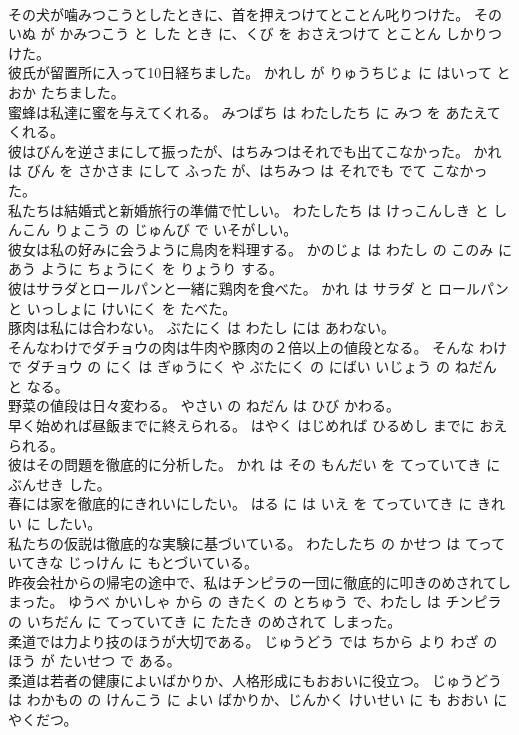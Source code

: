 \documentclass[8pt]{extreport}
\begin{document}
\begin{CJK}{UTF8}{min}
\\	その犬が噛みつこうとしたときに、首を押えつけてとことん叱りつけた。	その いぬ が かみつこう と した とき に、くび を おさえつけて とことん しかりつけた。	
\\	彼氏が留置所に入って10日経ちました。	かれし が りゅうちじょ に はいって とおか たちました。	
\\	蜜蜂は私達に蜜を与えてくれる。	みつばち は わたしたち に みつ を あたえて くれる。	
\\	彼はびんを逆さまにして振ったが、はちみつはそれでも出てこなかった。	かれ は びん を さかさま にして ふった が、はちみつ は それでも でて こなかった。	
\\	私たちは結婚式と新婚旅行の準備で忙しい。	わたしたち は けっこんしき と しんこん りょこう の じゅんび で いそがしい。	
\\	彼女は私の好みに会うように鳥肉を料理する。	かのじょ は わたし の このみ にあう ように ちょうにく を りょうり する。	
\\	彼はサラダとロールパンと一緒に鶏肉を食べた。	かれ は サラダ と ロールパン と いっしょに けいにく を たべた。	
\\	豚肉は私には合わない。	ぶたにく は わたし には あわない。	
\\	そんなわけでダチョウの肉は牛肉や豚肉の２倍以上の値段となる。	そんな わけ で ダチョウ の にく は ぎゅうにく や ぶたにく の にばい いじょう の ねだん と なる。	
\\	野菜の値段は日々変わる。	やさい の ねだん は ひび かわる。	
\\	早く始めれば昼飯までに終えられる。	はやく はじめれば ひるめし までに おえられる。	
\\	彼はその問題を徹底的に分析した。	かれ は その もんだい を てっていてき に ぶんせき した。	
\\	春には家を徹底的にきれいにしたい。	はる に は いえ を てっていてき に きれい に したい。	
\\	私たちの仮説は徹底的な実験に基づいている。	わたしたち の かせつ は てっていてきな じっけん に もとづいている。	
\\	昨夜会社からの帰宅の途中で、私はチンピラの一団に徹底的に叩きのめされてしまった。	ゆうべ かいしゃ から の きたく の とちゅう で、わたし は チンピラ の いちだん に てっていてき に たたき のめされて しまった。	
\\	柔道では力より技のほうが大切である。	じゅうどう では ちから より わざ の ほう が たいせつ で ある。	
\\	柔道は若者の健康によいばかりか、人格形成にもおおいに役立つ。	じゅうどう は わかもの の けんこう に よい ばかりか、じんかく けいせい に も おおい に やくだつ。	

\end{CJK}
\end{document}
